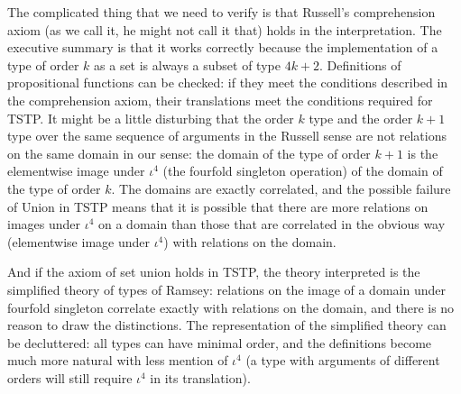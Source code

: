 \documentclass[12pt]{article}
\begin{document}
The complicated thing that we need to verify is that Russell's comprehension axiom (as we call it, he might not call it that) holds in the interpretation.  The executive summary is that it works correctly because the implementation of
a type of order $k$ as a set is always a subset of type $4k+2$.  Definitions of propositional functions can be checked:  if they meet the conditions described in the comprehension axiom, their translations meet the conditions required for TSTP.  It might be a little disturbing that the order $k$ type and the order $k+1$ type over the same sequence of arguments in the Russell sense are not relations on the same domain in our sense:  the domain of the type of order $k+1$ is the elementwise image under $\iota^4$ (the fourfold singleton operation) of the domain of the type of order $k$.  The domains are exactly correlated, and the possible failure of Union in TSTP means that it is possible that there are more relations on images under $\iota^4$ on a domain than those that are correlated in the obvious way (elementwise image under $\iota^4$) with relations on the domain.

And if the axiom of set union holds in TSTP, the theory interpreted is the simplified theory of types of Ramsey:  relations
on the image of a domain under fourfold singleton correlate exactly with relations on the domain, and there is no reason to draw the distinctions.  The representation of the simplified theory can be decluttered:  all types can have minimal order, and the definitions become much more natural with less mention of $\iota^4$ (a type with arguments of different orders will still require $\iota^4$ in its translation).
\end{document}

